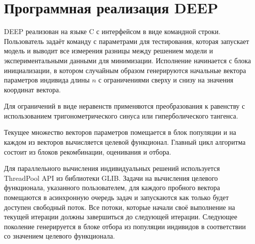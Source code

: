 \section*{Программная реализация DEEP}

DEEP реализован на языке C с интерфейсом в виде командной строки.
Пользователь задаёт команду с параметрами для тестирования,
которая запускает модель и выводит все измерения
разницы между решением модели
и экспериментальными данными для минимизации.
Исполнение начинается с блока инициализации,
в котором случайным образом генерируются
начальные вектора параметров индивида
длины \begin{math}n\end{math}
с ограничениями сверху и снизу
на значения координат вектора.

Для ограничений в виде неравенств
применяются преобразования к равенству
с использованием тригонометрического синуса
или гиперболического тангенса\cite{KozlovIjbra}.

Текущее множество векторов параметров помещается
в блок популяции и на каждом из векторов
вычисляется целевой функционал.
Главный цикл алгоритма состоит из блоков
рекомбинации, оценивания и отбора.

Для параллельного вычисления индивидуальных решений
используется ThreadPool API из библиотеки GLIB.
Задачи на вычисления целевого функционала,
указанного пользователем,
для каждого пробного вектора
помещаются в асинхронную очередь задач
и запускаются как только будет доступен свободный поток. 
Все потоки, которые начали своё выполнение
на текущей итерации должны завершиться
до следующей итерации.
Следующее поколение генерируется в блоке отбора
из популяции индивидов в соответствии
со значением целевого функционала.

